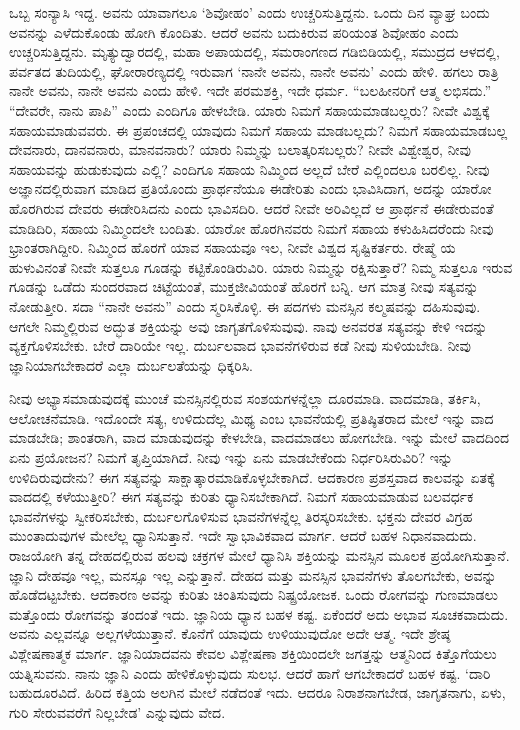 ಒಬ್ಬ ಸಂನ್ಯಾಸಿ ಇದ್ದ. ಅವನು ಯಾವಾಗಲೂ `ಶಿವೋಹಂ' ಎಂದು ಉಚ್ಚರಿಸುತ್ತಿದ್ದನು. ಒಂದು ದಿನ ವ್ಯಾಘ್ರ ಬಂದು ಅವನನ್ನು ಎಳೆದುಕೊಂಡು ಹೋಗಿ ಕೊಂದಿತು. ಆದರೆ ಅವನು ಬದುಕಿರುವ ಪರಿಯಂತ ಶಿವೋಹಂ ಎಂದು ಉಚ್ಚರಿಸುತ್ತಿದ್ದನು. ಮೃತ್ಯುದ್ವಾರದಲ್ಲಿ, ಮಹಾ ಅಪಾಯದಲ್ಲಿ, ಸಮರಾಂಗಣದ ಗಡಿಬಿಡಿಯಲ್ಲಿ, ಸಮುದ್ರದ ಆಳದಲ್ಲಿ, ಪರ್ವತದ ತುದಿಯಲ್ಲಿ, ಘೋರಾರಣ್ಯದಲ್ಲಿ ಇರುವಾಗ `ನಾನೇ ಅವನು, ನಾನೇ ಅವನು' ಎಂದು ಹೇಳಿ. ಹಗಲು ರಾತ್ರಿ ನಾನೇ ಅವನು, ನಾನೇ ಅವನು ಎಂದು ಹೇಳಿ. ಇದೇ ಪರಮಶಕ್ತಿ, ಇದೇ ಧರ್ಮ. “ಬಲಹೀನರಿಗೆ ಆತ್ಮ ಲಭಿಸದು.” “ದೇವರೇ, ನಾನು ಪಾಪಿ'' ಎಂದು ಎಂದಿಗೂ ಹೇಳಬೇಡಿ. ಯಾರು ನಿಮಗೆ ಸಹಾಯಮಾಡಬಲ್ಲರು? ನೀವೇ ವಿಶ್ವಕ್ಕೆ ಸಹಾಯಮಾಡುವವರು. ಈ ಪ್ರಪಂಚದಲ್ಲಿ ಯಾವುದು ನಿಮಗೆ ಸಹಾಯ ಮಾಡಬಲ್ಲದು? ನಿಮಗೆ ಸಹಾಯಮಾಡಬಲ್ಲ ದೇವನಾರು, ದಾನವನಾರು, ಮಾನವನಾರು? ಯಾರು ನಿಮ್ಮನ್ನು ಬಲಾತ್ಕರಿಸಬಲ್ಲರು? ನೀವೇ ವಿಶ್ವೇಶ್ವರ, ನೀವು ಸಹಾಯವನ್ನು ಹುಡುಕುವುದು ಎಲ್ಲಿ? ಎಂದಿಗೂ ಸಹಾಯ ನಿಮ್ಮಿಂದ ಅಲ್ಲದೆ ಬೇರೆ ಎಲ್ಲಿಂದಲೂ ಬರಲಿಲ್ಲ. ನೀವು ಅಜ್ಞಾನದಲ್ಲಿರುವಾಗ ಮಾಡಿದ ಪ್ರತಿಯೊಂದು ಪ್ರಾರ್ಥನೆಯೂ ಈಡೇರಿತು ಎಂದು ಭಾವಿಸಿದಾಗ, ಅದನ್ನು ಯಾರೋ ಹೊರಗಿರುವ ದೇವರು ಈಡೇರಿಸಿದನು ಎಂದು ಭಾವಿಸದಿರಿ. ಆದರೆ ನೀವೇ ಅರಿವಿಲ್ಲದೆ ಆ ಪ್ರಾರ್ಥನೆ ಈಡೇರುವಂತೆ ಮಾಡಿದಿರಿ, ಸಹಾಯ ನಿಮ್ಮಿಂದಲೇ ಬಂದಿತು. ಯಾರೋ ಹೊರಗಿನವರು ನಿಮಗೆ ಸಹಾಯ ಕಳುಹಿಸಿದರೆಂದು ನೀವು ಭ್ರಾಂತರಾಗಿದ್ದೀರಿ. ನಿಮ್ಮಿಂದ ಹೊರಗೆ ಯಾವ ಸಹಾಯವೂ ಇಲ, ನೀವೇ ವಿಶ್ವದ ಸೃಷ್ಟಿಕರ್ತರು. ರೇಷ್ಮೆ ಯ ಹುಳುವಿನಂತೆ ನೀವೇ ಸುತ್ತಲೂ ಗೂಡನ್ನು ಕಟ್ಟಿಕೊಂಡಿರುವಿರಿ. ಯಾರು ನಿಮ್ಮನ್ನು ರಕ್ಷಿಸುತ್ತಾರೆ? ನಿಮ್ಮ ಸುತ್ತಲೂ ಇರುವ ಗೂಡನ್ನು ಒಡೆದು ಸುಂದರವಾದ ಚಿಟ್ಟೆಯಂತೆ, ಮುಕ್ತಜೀವಿಯಂತೆ ಹೊರಗೆ ಬನ್ನಿ. ಆಗ ಮಾತ್ರ ನೀವು ಸತ್ಯವನ್ನು ನೋಡುತ್ತೀರಿ. ಸದಾ “ನಾನೇ ಅವನು” ಎಂದು ಸ್ಮರಿಸಿಕೊಳ್ಳಿ. ಈ ಪದಗಳು ಮನಸ್ಸಿನ ಕಲ್ಮಷವನ್ನು ದಹಿಸುವುವು. ಆಗಲೇ ನಿಮ್ಮಲ್ಲಿರುವ ಅದ್ಭುತ ಶಕ್ತಿಯನ್ನು ಅವು ಜಾಗೃತಗೊಳಿಸುವುವು. ನಾವು ಅನವರತ ಸತ್ಯವನ್ನು ಕೇಳಿ ಇದನ್ನು ವ್ಯಕ್ತಗೊಳಿಸಬೇಕು. ಬೇರೆ ದಾರಿಯೇ ಇಲ್ಲ. ದುರ್ಬಲವಾದ ಭಾವನೆಗಳಿರುವ ಕಡೆ ನೀವು ಸುಳಿಯಬೇಡಿ. ನೀವು ಜ್ಞಾನಿಯಾಗಬೇಕಾದರೆ ಎಲ್ಲಾ ದುರ್ಬಲತೆಯನ್ನು ಧಿಕ್ಕರಿಸಿ.

ನೀವು ಅಭ್ಯಾಸಮಾಡುವುದಕ್ಕೆ ಮುಂಚೆ ಮನಸ್ಸಿನಲ್ಲಿರುವ ಸಂಶಯಗಳನ್ನೆಲ್ಲಾ ದೂರಮಾಡಿ. ವಾದಮಾಡಿ, ತರ್ಕಿಸಿ, ಆಲೋಚನೆಮಾಡಿ. ಇದೊಂದೇ ಸತ್ಯ, ಉಳಿದುದೆಲ್ಲ ಮಿಥ್ಯ ಎಂಬ ಭಾವನೆಯಲ್ಲಿ ಪ್ರತಿಷ್ಠಿತರಾದ ಮೇಲೆ ಇನ್ನು ವಾದ ಮಾಡಬೇಡಿ; ಶಾಂತರಾಗಿ, ವಾದ ಮಾಡುವುದನ್ನು ಕೇಳಬೇಡಿ, ವಾದಮಾಡಲು ಹೋಗಬೇಡಿ. ಇನ್ನು ಮೇಲೆ ವಾದದಿಂದ ಏನು ಪ್ರಯೋಜನ? ನಿಮಗೆ ತೃಪ್ತಿಯಾಗಿದೆ. ನೀವು ಇನ್ನು ಏನು ಮಾಡಬೇಕೆಂದು ನಿರ್ಧರಿಸಿರುವಿರಿ? ಇನ್ನು ಉಳಿದಿರುವುದೇನು? ಈಗ ಸತ್ಯವನ್ನು ಸಾಕ್ಷಾತ್ಕಾರಮಾಡಿಕೊಳ್ಳಬೇಕಾಗಿದೆ. ಆದಕಾರಣ ಪ್ರಶಸ್ತವಾದ ಕಾಲವನ್ನು ಏತಕ್ಕೆ ವಾದದಲ್ಲಿ ಕಳೆಯುತ್ತೀರಿ? ಈಗ ಸತ್ಯವನ್ನು ಕುರಿತು ಧ್ಯಾನಿಸಬೇಕಾಗಿದೆ. ನಿಮಗೆ ಸಹಾಯಮಾಡುವ ಬಲವರ್ಧಕ ಭಾವನೆಗಳನ್ನು ಸ್ವೀಕರಿಸಬೇಕು, ದುರ್ಬಲಗೊಳಿಸುವ ಭಾವನೆಗಳನ್ನೆಲ್ಲ ತಿರಸ್ಕರಿಸಬೇಕು. ಭಕ್ತನು ದೇವರ ವಿಗ್ರಹ ಮುಂತಾದುವುಗಳ ಮೇಲೆಲ್ಲ ಧ್ಯಾನಿಸುತ್ತಾನೆ. ಇದೇ ಸ್ವಾಭಾವಿಕವಾದ ಮಾರ್ಗ. ಆದರೆ ಬಹಳ ನಿಧಾನವಾದುದು. ರಾಜಯೋಗಿ ತನ್ನ ದೇಹದಲ್ಲಿರುವ ಹಲವು ಚಕ್ರಗಳ ಮೇಲೆ ಧ್ಯಾನಿಸಿ ಶಕ್ತಿಯನ್ನು ಮನಸ್ಸಿನ ಮೂಲಕ ಪ್ರಯೋಗಿಸುತ್ತಾನೆ. ಜ್ಞಾನಿ ದೇಹವೂ ಇಲ್ಲ, ಮನಸ್ಸೂ ಇಲ್ಲ ಎನ್ನುತ್ತಾನೆ. ದೇಹದ ಮತ್ತು ಮನಸ್ಸಿನ ಭಾವನೆಗಳು ತೊಲಗಬೇಕು, ಅವನ್ನು ಹೊಡೆದಟ್ಟಬೇಕು. ಆದಕಾರಣ ಅವನ್ನು ಕುರಿತು ಚಿಂತಿಸುವುದು ನಿಷ್ಪ್ರಯೋಜಕ. ಒಂದು ರೋಗವನ್ನು ಗುಣಮಾಡಲು ಮತ್ತೊಂದು ರೋಗವನ್ನು ತಂದಂತೆ ಇದು. ಜ್ಞಾನಿಯ ಧ್ಯಾನ ಬಹಳ ಕಷ್ಟ. ಏಕೆಂದರೆ ಅದು ಅಭಾವ ಸೂಚಕವಾದುದು. ಅವನು ಎಲ್ಲವನ್ನೂ ಅಲ್ಲಗಳೆಯುತ್ತಾನೆ. ಕೊನೆಗೆ ಯಾವುದು ಉಳಿಯುವುದೋ ಅದೇ ಆತ್ಮ. ಇದೇ ಶ್ರೇಷ್ಠ ವಿಶ್ಲೇಷಣಾತ್ಮಕ ಮಾರ್ಗ. ಜ್ಞಾನಿಯಾದವನು ಕೇವಲ ವಿಶ್ಲೇಷಣಾ ಶಕ್ತಿಯಿಂದಲೇ ಜಗತ್ತನ್ನು ಆತ್ಮನಿಂದ ಕಿತ್ತೊಗೆಯಲು ಯತ್ನಿಸುವನು. ನಾನು ಜ್ಞಾನಿ ಎಂದು ಹೇಳಿಕೊಳ್ಳುವುದು ಸುಲಭ. ಆದರೆ ಹಾಗೆ ಆಗಬೇಕಾದರೆ ಬಹಳ ಕಷ್ಟ. `ದಾರಿ ಬಹುದೂರವಿದೆ. ಹಿರಿದ ಕತ್ತಿಯ ಅಲಗಿನ ಮೇಲೆ ನಡೆದಂತೆ ಇದು. ಆದರೂ ನಿರಾಶನಾಗಬೇಡ, ಜಾಗೃತನಾಗು, ಏಳು, ಗುರಿ ಸೇರುವವರೆಗೆ ನಿಲ್ಲಬೇಡ' ಎನ್ನುವುದು ವೇದ.

